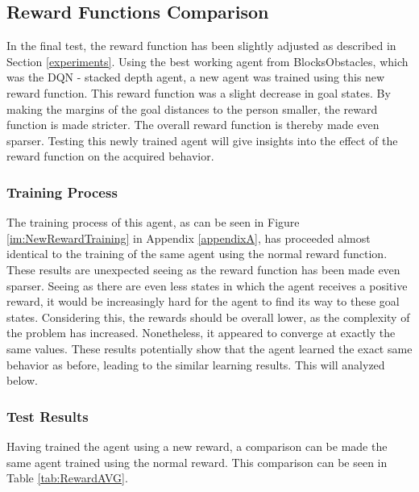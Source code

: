 \subsection{Reward Functions Comparison}
In the final test, the reward function has been slightly adjusted as described in Section \ref{experiments}.
Using the best working agent from BlocksObstacles, which was the DQN - stacked depth agent, 
a new agent was trained using this new reward function. This reward function was a slight 
decrease in goal states. By making the margins of the goal distances to the 
person smaller, the reward function is made stricter. The overall reward function is thereby made even 
sparser. Testing this newly trained agent will give insights into the effect of the reward 
function on the acquired behavior. 

\subsubsection{Training Process}
The training process of this agent, as can be seen in Figure \ref{im:NewRewardTraining} in 
Appendix \ref{appendixA}, has proceeded almost identical to the training of the same agent 
using the normal reward function. These results are unexpected seeing as the reward function 
has been made even sparser. Seeing as there are even less states in which the agent receives 
a positive reward, it would be increasingly hard for the agent to find its way to these 
goal states. Considering this, the rewards should be overall lower, as the complexity of the 
problem has increased. Nonetheless, it appeared to converge at exactly the same values. These 
results potentially show that the agent learned the exact same behavior as before, leading 
to the similar learning results. This will analyzed below. 

\subsubsection{Test Results}
Having trained the agent using a new reward, a comparison can be made the 
same agent trained using the normal reward. This comparison can be seen in Table 
\ref{tab:RewardAVG}. 

